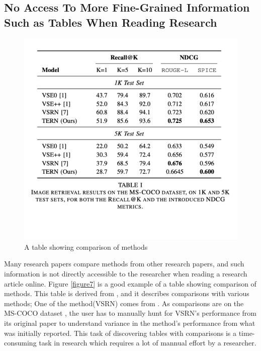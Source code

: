 \subsection{No Access To More Fine-Grained Information Such as Tables When Reading Research}
\begin{figure}[h]
    \centering
    \includegraphics[width=\maxwidth{\textwidth}]{src/images/table-example.pdf}
    \caption{A table showing comparison of methods}
    \label{figure\arabic{figurecounter}}
\end{figure}
Many research papers compare methods from other research papers, and such information is not directly accessible to the researcher when reading a research article online. Figure \ref{figure7} is a good example of a table showing comparison of methods. This table is derived from \cite{messina2020transformer}, and it describes comparisons with various methods; One of the method(VSRN) comes from \cite{li2019visual}. As comparisons are on the MS-COCO dataset \parencite{lin2014microsoft}, the user has to manually hunt for VSRN's performance from its original paper to understand variance in the method's performance from what was initially reported. This task of discovering tables with comparisons is a time-consuming task in research which requires a lot of mannual effort by a researcher.  

